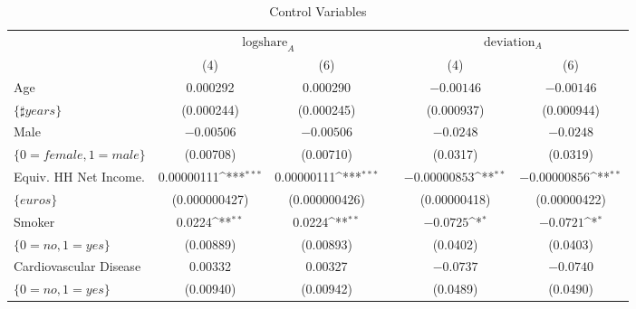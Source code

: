 \documentclass[smallcondensed]{svjour3}
\begin{document}
\begin{landscape}
\begin{table}[ht!]
{{\begin{tabularx}{16cm}{l*{6}{c}}
\end{tabularx}
}}
\end{table}
\end{landscape}
%
\clearpage
%
\begin{table}[ht]
\centering
\caption{Control Variables}\label{tab:regression_share_cov}
{\footnotesize
{
\def\sym#1{\ifmmode^{#1}\else\(^{#1}\)\fi}
\begin{tabularx}{13.5cm}{lccccc}\hline
                            & \multicolumn{2}{c}{$\mbox{logshare}_A$}              &   & \multicolumn{2}{c}{$\mbox{deviation}_A$}              \\\cline{2-3}\cline{5-6}
                            & \multicolumn{1}{c}{(4)}   &\multicolumn{1}{c}{(6)}   &   & \multicolumn{1}{c}{(4)}   & \multicolumn{1}{c}{(6)}   \\\hline\hline
   Age                      &   0.000292               &   0.000290                &   & $-0.00146$                & $-0.00146$                \\
   $\{\sharp years\}$       &  (0.000244)              &  (0.000245)               &   &  (0.000937)               &  (0.000944)               \\
   [1em]
   Male                     & $-0.00506$               & $-0.00506$                &   & $-0.0248$                 & $-0.0248$                 \\
   $\{0=female,1=male\}$    &  (0.00708)               &  (0.00710)                &   &  (0.0317)                 &  (0.0319)                 \\
   [1em]
   Equiv. HH Net Income.    &   0.00000111\sym{***}    &   0.00000111\sym{***}     &   & $-0.00000853$\sym{**}     & $-0.00000856$\sym{**}     \\
   $\{euros\}$              &  (0.000000427)           &  (0.000000426)            &   &  (0.00000418)             &  (0.00000422)             \\
   [1em]
   Smoker                   &   0.0224\sym{**}         &   0.0224\sym{**}          &   & $-0.0725$\sym{*}          & $-0.0721$\sym{*}          \\
   $\{0=no,1=yes\}$         &  (0.00889)               &  (0.00893)                &   &  (0.0402)                 &  (0.0403)                 \\
   [1em]
   Cardiovascular Disease   &   0.00332                &   0.00327                 &   & $-0.0737$                 & $-0.0740$                 \\
   $\{0=no,1=yes\}$         &  (0.00940)               &  (0.00942)                &   &  (0.0489)                 &  (0.0490)                 \\

\end{tabularx}}}
\end{table}
\end{document}

